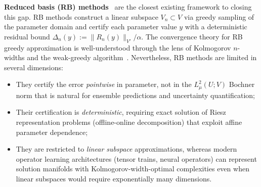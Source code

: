 \documentclass[a4paper,11pt]{article}
\theoremstyle{plain}
\theoremstyle{definition}
\begin{document}
\textbf{Reduced basis (RB) methods}~\cite{maday2002reduced,binev2011convergence} are the closest existing framework to closing this gap.
RB methods construct a linear subspace $V_n\subset V$ via greedy sampling of the parameter domain and certify each parameter value $y$ with a deterministic residual bound $\Delta_n(y):=\|R_n(y)\|_{V'}/\alpha$.
The convergence theory for RB greedy approximation is well-understood through the lens of Kolmogorov $n$-widths and the weak-greedy algorithm~\cite{cohen2011optimal,binev2011convergence}.
Nevertheless, RB methods are limited in several dimensions:
\begin{itemize}
  \item They certify the error \emph{pointwise} in parameter, not in the $L^2_\mu(U;V)$ Bochner norm that is natural for ensemble predictions and uncertainty quantification;
  \item Their certification is \emph{deterministic}, requiring exact solution of Riesz representation problems (offline-online decomposition) that exploit affine parameter dependence;
  \item They are restricted to \emph{linear subspace} approximations, whereas modern operator learning architectures (tensor trains, neural operators) can represent solution manifolds with Kolmogorov-width-optimal complexities even when linear subspaces would require exponentially many dimensions.
\end{itemize}
\end{document}
